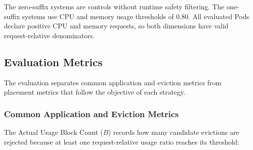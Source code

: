 \begin{table}[H]
    \centering
    \caption{Actual Usage Evictor Comparison Systems}
    \label{tab:actualusage4_matrix}
    \renewcommand{\arraystretch}{1.2}
\end{table}

The zero-suffix systems are controls without runtime safety filtering. The one-suffix systems use CPU and memory usage thresholds of \(0.80\). All evaluated Pods declare positive CPU and memory requests, so both dimensions have valid request-relative denominators.

\subsection{Evaluation Metrics}
\label{subsec:actualusage4_evaluationmetrics}
The evaluation separates common application and eviction metrics from placement metrics that follow the objective of each strategy.

\subsubsection{Common Application and Eviction Metrics}
\label{subsubsec:actualusage4_metric_blocks}
The Actual Usage Block Count (\(B\)) records how many candidate evictions are rejected because at least one request-relative usage ratio reaches its threshold:

